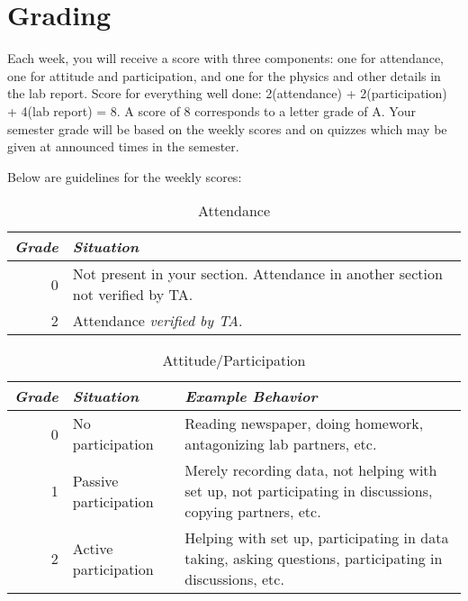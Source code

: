 \documentclass{article}
\begin{document}
\section*{Grading}
Each week, you will receive a score with three components: one for attendance,
one for attitude and participation, and one for the physics and other details
in the lab report. Score for everything well done: 2(attendance) +
2(participation) + 4(lab report) = 8. A score of 8 corresponds to a letter
grade of A. Your semester grade will be based on the weekly scores and on
quizzes which may be given at announced times in the semester.

Below are guidelines for the weekly scores:

\begin{table}[htbp]
\caption*{Attendance}
\begin{tabularx}{\linewidth}{|r|X|}
\hline
\emph{Grade} & \emph{Situation} \\ \hline
0 & Not present in your section. Attendance in another section not verified by
    TA. \\ \hline
2 & Attendance \emph{verified by TA}. \\ \hline
\end{tabularx}
\label{}
\end{table}

\begin{table}[htbp]
\caption*{Attitude/Participation}
\begin{tabularx}{\linewidth}{|r|l|X|}
\hline
\multicolumn{1}{|l|}{\emph{Grade}} & \emph{Situation} & \emph{Example Behavior} \\ \hline
0 & No participation & Reading newspaper, doing homework, antagonizing lab
                       partners, etc. \\ \hline
1 & Passive participation & Merely recording data, not helping with set up, not
                            participating in discussions, copying partners,
                            etc. \\ \hline
2 & Active participation & Helping with set up, participating in data taking,
                           asking questions, participating in discussions, etc.
                           \\ \hline
\end{tabularx}
\label{}
\end{table}
\end{document}
